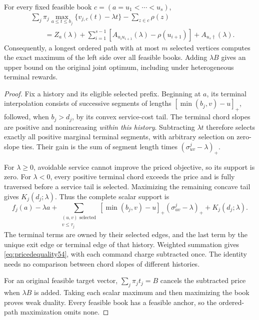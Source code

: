 \begin{theorem}\label{thm:price54}
For every fixed feasible book $c=(a=u_1<\cdots<u_s)$,
\begin{equation}\label{eq:pricedequality54}
 \begin{split}
 &\sum_j\pi_j\max_{a\leq t\leq b_j}\{v_{j,c}(t)-\lambda t\}-\sum_{z\in c}\rho(z)\\
 &\qquad=Z_a(\lambda)+\sum_{i=1}^{s-1}[A_{u_i u_{i+1}}(\lambda)-\rho(u_{i+1})]+A_{u_s\dagger}(\lambda).
\end{split}
\end{equation}
Consequently, a longest ordered path with at most $m$ selected vertices computes the exact maximum of the left side over all feasible books. Adding $\lambda B$ gives an upper bound on the original joint optimum, including under heterogeneous terminal rewards.
\end{theorem}
\begin{proof}
Fix a history and its eligible selected prefix. Beginning at $a$, its terminal interpolation consists of successive segments of lengths $[\min(b_j,v)-u]_+$, followed, when $b_j>d_j$, by its convex service-cost tail. The terminal chord slopes are positive and nonincreasing \emph{within this history}. Subtracting $\lambda t$ therefore selects exactly all positive marginal terminal segments, with arbitrary selection on zero-slope ties. Their gain is the sum of segment length times $(\sigma^j_{uv}-\lambda)_+$.

For $\lambda\geq0$, avoidable service cannot improve the priced objective, so its support is zero. For $\lambda<0$, every positive terminal chord exceeds the price and is fully traversed before a service tail is selected. Maximizing the remaining concave tail gives $K_j(d_j;\lambda)$. Thus the complete scalar support is
\[
 f_j(a)-\lambda a+
 \sum_{\substack{(u,v)\text{ selected}\\v\leq\tau_j}}
 [\min(b_j,v)-u]_+(\sigma^j_{uv}-\lambda)_+ +K_j(d_j;\lambda).
\]
The terminal terms are owned by their selected edges, and the last term by the unique exit edge or terminal edge of that history. Weighted summation gives \eqref{eq:pricedequality54}, with each command charge subtracted once. The identity needs no comparison between chord slopes of different histories.

For an original feasible target vector, $\sum_j\pi_jt_j=B$ cancels the subtracted price when $\lambda B$ is added. Taking each scalar maximum and then maximizing the book proves weak duality. Every feasible book has a feasible anchor, so the ordered-path maximization omits none.
\end{proof}

